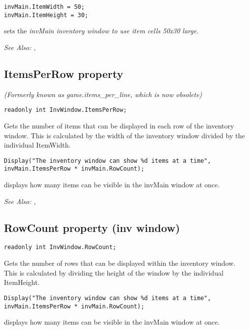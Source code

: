 \begin{verbatim}
invMain.ItemWidth = 50;
invMain.ItemHeight = 30;
\end{verbatim}
sets the \it{invMain} inventory window to use item cells 50x30 large.

\it{See Also:} ,


\subsection{ItemsPerRow property}\label{InvWindow.ItemsPerRow}%

\it{(Formerly known as game.items_per_line, which is now obsolete)}

\begin{verbatim}
readonly int InvWindow.ItemsPerRow;
\end{verbatim}
Gets the number of items that can be displayed in each row of the inventory window.
This is calculated by the width of the inventory window divided by the individual ItemWidth.

\begin{verbatim}
Display("The inventory window can show %d items at a time", invMain.ItemsPerRow * invMain.RowCount);
\end{verbatim}
displays how many items can be visible in the invMain window at once.

\it{See Also:} ,


\subsection{RowCount property (inv window)}\label{InvWindow.RowCount}%

\begin{verbatim}
readonly int InvWindow.RowCount;
\end{verbatim}
Gets the number of rows that can be displayed within the inventory window. This is
calculated by dividing the height of the window by the individual ItemHeight.

\begin{verbatim}
Display("The inventory window can show %d items at a time", invMain.ItemsPerRow * invMain.RowCount);
\end{verbatim}
displays how many items can be visible in the invMain window at once.

